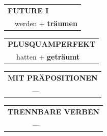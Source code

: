 \documentclass[10pt,a4paper]{revtex4-2}
\begin{document}
\begin{verbbox}
\begin{tabular}{rl}
    \multicolumn{2}{l}{\textbf{FUTURE I} }\\
   & werden + \textbf{träumen}\\
 
  \end{tabular}
\hfill
   \begin{tabular}{rl}
      \multicolumn{2}{l}{\textbf{PLUSQUAMPERFEKT}}\\
   & hatten + \textbf{geträumt}\\
  \end{tabular}
  
  \vspace{10pt}


\begin{tabular}{lll}
\multicolumn{3}{l}{\textbf{MIT PRÄPOSITIONEN}}\\
& ---\\
\end{tabular}
\hfill
\begin{tabular}{lll}
\multicolumn{3}{l}{\textbf{TRENNBARE VERBEN}}\\
& ---\\
\end{tabular}

  \vspace{-5pt}

\end{verbbox}
\end{document}
